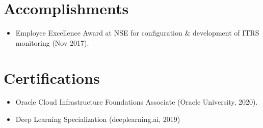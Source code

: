 \documentclass[letterpaper,11pt]{article}
\newcommand{\resumeItem}[2]{
  \item\small{
    \textbf{#1}{ #2 \vspace{-2pt}}
  }
}
\newcommand{\resumeSubItem}[2]{\resumeItem{#1}{#2}\vspace{-4pt}}
\newcommand{\resumeSubHeadingListStart}{\begin{itemize}[leftmargin=*]}
\newcommand{\resumeSubHeadingListEnd}{\end{itemize}}
\begin{document}
\section{Accomplishments}
\resumeSubHeadingListStart
  \resumeSubItem{}{Employee Excellence Award at NSE for configuration \& development of ITRS monitoring (Nov 2017).}
 \resumeSubHeadingListEnd
\section{Certifications}
 \resumeSubHeadingListStart
 \resumeSubItem{}{Oracle Cloud Infrastructure Foundations Associate (Oracle University, 2020).}
  \resumeSubItem{}{Deep Learning Specialization (deeplearning.ai, 2019)}
 \resumeSubHeadingListEnd
\end{document}

